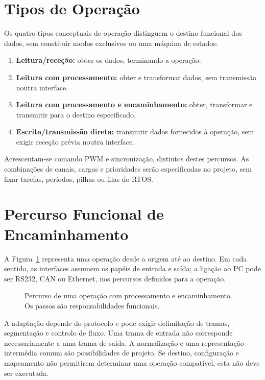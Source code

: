\section{Tipos de Operação}

Os quatro tipos conceptuais de operação distinguem o destino funcional
dos dados, sem constituir modos exclusivos ou uma máquina de estados:
\begin{enumerate}
    \item \textbf{Leitura/receção:} obter os dados, terminando a operação.
    \item \textbf{Leitura com processamento:} obter e transformar dados,
    sem transmissão noutra interface.
    \item \textbf{Leitura com processamento e encaminhamento:} obter,
    transformar e transmitir para o destino especificado.
    \item \textbf{Escrita/transmissão direta:} transmitir dados fornecidos
    à operação, sem exigir receção prévia noutra interface.
\end{enumerate}

Acrescentam-se comando PWM e sincronização, distintos destes percursos.
As combinações de canais, cargas e prioridades serão especificadas no
projeto, sem fixar tarefas, períodos, pilhas ou filas do RTOS.

\section{Percurso Funcional de Encaminhamento}

A Figura~\ref{fig:arquitetura-preliminar} representa uma operação desde
a origem até ao destino. Em cada sentido, as interfaces assumem os
papéis de entrada e saída; a ligação ao PC pode ser RS232, CAN ou
Ethernet, nos percursos definidos para a operação.

\begin{figure}[htbp]
    \centering
    \caption[Percurso funcional de encaminhamento.]{Percurso de uma operação com processamento e encaminhamento. Os passos são responsabilidades funcionais.}
    \label{fig:arquitetura-preliminar}
\end{figure}

A adaptação depende do protocolo e pode exigir delimitação de tramas,
segmentação e controlo de fluxo. Uma trama de entrada não corresponde
necessariamente a uma trama de saída. A normalização e uma representação
intermédia comum são possibilidades de projeto. Se destino, configuração
e mapeamento não permitirem determinar uma operação compatível, esta
não deve ser executada.

